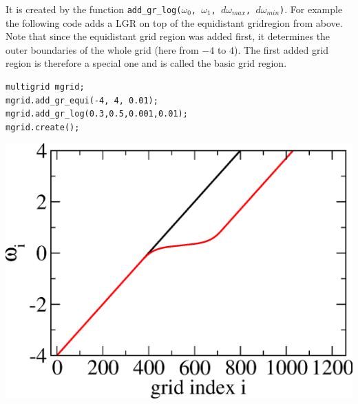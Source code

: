 It is created by the function \texttt{add\_gr\_log($\omega_0$, $\omega_1$, $d\omega_{max}$, $d\omega_{min}$)}. For example the following code adds a LGR on top of the equidistant gridregion from above. Note that since the equidistant grid region was added first, it determines the outer boundaries of the whole grid (here from $-4$ to $4$). The first added grid region is therefore a special one and is called the basic grid region.
\\
\vspace{1cm}
\noindent\begin{minipage}[l]{0.6\textwidth}
\begin{lstlisting}
multigrid mgrid;
mgrid.add_gr_equi(-4, 4, 0.01);
mgrid.add_gr_log(0.3,0.5,0.001,0.01);
mgrid.create();
\end{lstlisting}
\end{minipage}
\begin{minipage}[]{0.4\textwidth}
	\includegraphics[width=1.0\textwidth]{pics/multigrid_01.eps}
\end{minipage}

